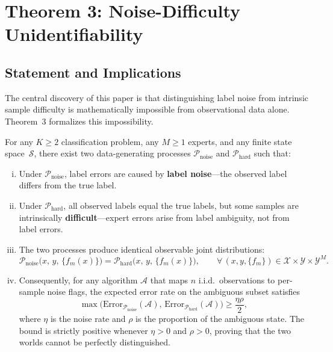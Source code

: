 
\section{Theorem 3: Noise-Difficulty Unidentifiability}
\label{sec:thm3}

\subsection{Statement and Implications}
\label{sec:thm3_statement}

The central discovery of this paper is that distinguishing label noise from
intrinsic sample difficulty is mathematically impossible from observational data
alone.  Theorem~3 formalizes this impossibility.

\begin{theorem}
  \label{thm:unidentifiability}
  For any $K \ge 2$ classification problem, any $M \ge 1$ experts, and any finite
  state space~$\mathcal{S}$, there exist two data-generating processes
  $\mathcal{P}_{\text{noise}}$ and $\mathcal{P}_{\text{hard}}$ such that:
  \begin{enumerate}[(i)]
    \item Under $\mathcal{P}_{\text{noise}}$, label errors are caused by
      \textbf{label noise}---the observed label differs from the true label.
    \item Under $\mathcal{P}_{\text{hard}}$, all observed labels equal the true
      labels, but some samples are intrinsically
      \textbf{difficult}---expert errors arise from label ambiguity, not from
      label errors.
    \item The two processes produce identical observable joint distributions:
      \[
      \mathcal{P}_{\text{noise}}\bigl(x,\,y,\,\{f_m(x)\}\bigr)
      = \mathcal{P}_{\text{hard}}\bigl(x,\,y,\,\{f_m(x)\}\bigr),
      \qquad \forall\,(x,y,\{f_m\}) \in \mathcal{X}\times\mathcal{Y}\times\mathcal{Y}^M.
      \]
    \item Consequently, for any algorithm $\mathcal{A}$ that maps $n$ i.i.d.\
      observations to per-sample noise flags, the expected error rate on the
      ambiguous subset satisfies
      \[
      \max\bigl(\mathrm{Error}_{\mathcal{P}_{\text{noise}}}(\mathcal{A}),\,
             \mathrm{Error}_{\mathcal{P}_{\text{hard}}}(\mathcal{A})\bigr)
      \ge \frac{\eta\rho}{2},
      \]
      where $\eta$ is the noise rate and $\rho$ is the proportion of the
      ambiguous state.  The bound is strictly positive whenever $\eta>0$ and
      $\rho>0$, proving that the two worlds cannot be perfectly distinguished.
  \end{enumerate}
\end{theorem}

